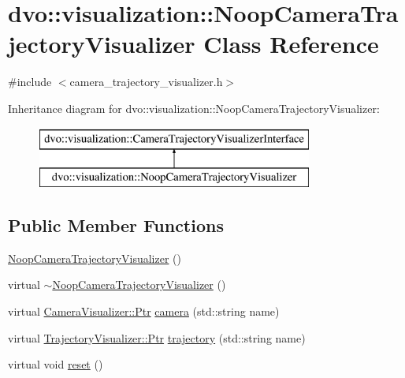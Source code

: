 \hypertarget{classdvo_1_1visualization_1_1_noop_camera_trajectory_visualizer}{}\section{dvo\+:\+:visualization\+:\+:Noop\+Camera\+Trajectory\+Visualizer Class Reference}
\label{classdvo_1_1visualization_1_1_noop_camera_trajectory_visualizer}


{\ttfamily \#include $<$camera\+\_\+trajectory\+\_\+visualizer.\+h$>$}

Inheritance diagram for dvo\+:\+:visualization\+:\+:Noop\+Camera\+Trajectory\+Visualizer\+:\begin{figure}[H]
\begin{center}
\leavevmode
\includegraphics[height=2.000000cm]{classdvo_1_1visualization_1_1_noop_camera_trajectory_visualizer}
\end{center}
\end{figure}
\subsection*{Public Member Functions}
\begin{DoxyCompactItemize}
\item 
\mbox{\hyperlink{classdvo_1_1visualization_1_1_noop_camera_trajectory_visualizer_a3ef47107df86a08263381af353a70017}{Noop\+Camera\+Trajectory\+Visualizer}} ()
\item 
virtual \mbox{\hyperlink{classdvo_1_1visualization_1_1_noop_camera_trajectory_visualizer_a95788f9067a0da57c0da26c72be8143a}{$\sim$\+Noop\+Camera\+Trajectory\+Visualizer}} ()
\item 
virtual \mbox{\hyperlink{classdvo_1_1visualization_1_1_camera_visualizer_a473ebecc62e1d4edba21027d858789a2}{Camera\+Visualizer\+::\+Ptr}} \mbox{\hyperlink{classdvo_1_1visualization_1_1_noop_camera_trajectory_visualizer_afaf7c129a6112015c81a2e25d0002966}{camera}} (std\+::string name)
\item 
virtual \mbox{\hyperlink{classdvo_1_1visualization_1_1_trajectory_visualizer_aac33ef5979fe64ee33409f1afa977fd3}{Trajectory\+Visualizer\+::\+Ptr}} \mbox{\hyperlink{classdvo_1_1visualization_1_1_noop_camera_trajectory_visualizer_a73cd3c7ed8a3817c5f6d480d97aa24c5}{trajectory}} (std\+::string name)
\item 
virtual void \mbox{\hyperlink{classdvo_1_1visualization_1_1_noop_camera_trajectory_visualizer_afa3b5e4aff0306755ca3b53ef70008c4}{reset}} ()
\end{DoxyCompactItemize}



